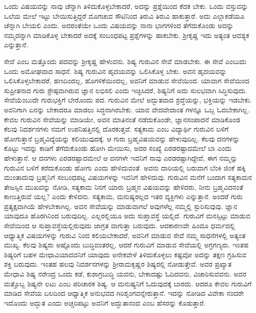 ಒಂದು ವಿಷಯವನ್ನು ನಾವು ಚೆನ್ನಾಗಿ ತಿಳಿದುಕೊಳ್ಳಬೇಕಾದರೆ, ಅದನ್ನು ಪ್ರಶ್ನೆಯಿಂದ ಕೆದಕ ಬೇಕು. ಒಂದು ವಸ್ತುವನ್ನು ಒಲೆಯ ಮೇಲೆ ಇಟ್ಟು ಬೇಯಿಸುತ್ತಿದ್ದರೆ ಮೊಗಚುವ ಸೌಟಿನಿಂದ ತಿರುವಿ ತಿರುವಿ ಹಾಕುತ್ತಾರೆ. ಅದು ಎಲ್ಲಾಕಡೆಯೂ ಚೆನ್ನಾಗಿ ಬೇಯಲಿ ಎಂದು. ಅದರಂತೆಯೇ ಒಂದು ವಿಷಯವನ್ನು ನಾನಾ ಭಾಗಗಳಿಂದ ತೆಗೆದುಕೊಂಡು ಅದನ್ನು ನಮ್ಮದನ್ನಾಗಿ ಮಾಡಿಕೊಳ್ಳ ಬೇಕಾದರೆ ಅದಕ್ಕೆ ಸಂಬಂಧಪಟ್ಟ ಪ್ರಶ್ನೆಗಳನ್ನು ಹಾಕಬೇಕು. ಶ‍್ರೀಕೃಷ್ಣ ಇದು ಅತ್ಯಂತ ಆವಶ್ಯಕ ಎನ್ನುತ್ತಾನೆ.

ಸೇವೆ ಎಂಬ ಮತ್ತೊಂದು ಪದವನ್ನು ಶ‍್ರೀಕೃಷ್ಣ ಹೇಳುವನು. ಶಿಷ್ಯ ಗುರುವಿನ ಸೇವೆ ಮಾಡಬೇಕು. ಈ ಸೇವೆ ಎಂಬುದು ಒಂದು ಅಮೋಘವಾದ ಸಾಧನೆ. ಶಿಷ್ಯ ಗುರುವಿನ ಹೃದಯವನ್ನು ಒಲಿಸಿಕೊಳ್ಳ ಬೇಕು. ಅವನ ಹೃದಯವನ್ನು ಒಲಿಸಿಕೊಳ್ಳಬೇಕಾದರೆ, ಹಣದಿಂದಲ್ಲ, ಹೊಗಳಿಕೆಯಿಂದಲ್ಲ, ಅವನಿಗೆ ಮಾಡುವ ಸೇವೆಯಿಂದ. ಯಾವಾಗ ಸೇವೆಯಿಂದ ಸುಪ್ರೀತನಾದ ಗುರು ಶ್ರೇಷ್ಠವಾಗಿರುವ ಜ್ಞಾನ ಲಭಿಸಲಿ ಎಂದು ಇಚ್ಛಿಸಿದರೆ, ಶಿಷ್ಯನಿಗೆ ಅದು ಸುಲಭವಾಗಿ ಸಿದ್ಧಿಸುವುದು. ಸೇವೆಯೆಂಬುದೇ ಗುರುಭಕ್ತಿಗೆ ಬೇರೊಂದು ಪದ. ಗುರುವಿನ ಮೇಲೆ ಅದ್ಭುತವಾದ ಶ್ರದ್ಧೆಯನ್ನು, ಭಕ್ತಿಯನ್ನು ಇಡಬೇಕು. ಅವನಿಗಾಗಿ ಏನನ್ನು ಬೇಕಾದರೂ ಮಾಡಲು ಸಿದ್ಧನಾಗಿರಬೇಕು. ಯಾವ ವೇದವೇದಾಂತ ಗಳನ್ನೂ ಒಬ್ಬ ಓದಬೇಕಾಗಿಲ್ಲ. ಕೇವಲ ಗುರುವಿನ ಸೇವೆಯನ್ನು ಮಾಡಿಯೇ, ಅವನ ಮಾತಿನಂತೆ ನಡೆದುಕೊಂಡೇ, ಜ್ಞಾನಸಂಪಾದನೆ ಮಾಡಿಕೊಂಡ ಕೆಲವು ನಿದರ್ಶನಗಳು ನಮಗೆ ಉಪನಿಷತ್ತಿನಲ್ಲಿ ದೊರಕುತ್ತವೆ. ಸತ್ಯಕಾಮ ಎಂಬ ವಿದ್ಯಾರ್ಥಿ ಗುರುವಿನ ಬಳಿಗೆ ಹೋಗುತ್ತಾನೆ ಬ್ರಹ್ಮವಿದ್ಯೆಯನ್ನು ಕಲಿಯುವುದಕ್ಕೆ. ಆ ಗುರು ಬ್ರಹ್ಮವಿಷಯವನ್ನು ಹೇಳುವುದಿಲ್ಲ. ಕೆಲವು ದನಗಳನ್ನು ಕೊಟ್ಟು ಇದನ್ನು ಕಾಡಿಗೆ ತೆಗೆದುಕೊಂಡು ಹೋಗಿ ಮೇಯಿಸು, ಅದರ ಸಂಖ್ಯೆ ಎರಡರಷ್ಟಾದಮೇಲೆ ಬಾ ಎಂದು ಹೇಳುತ್ತಾನೆ. ಆ ದನಗಳು ಎರಡರಷ್ಟಾದಮೇಲೆ ಆ ದನಗಳೇ ಇವನಿಗೆ ನಾವು ಎರಡರಷ್ಟಾಗಿದ್ದೇವೆ, ಈಗ ನಮ್ಮನ್ನು ಗುರುವಿನ ಬಳಿಗೆ ಕರೆದುಕೊಂಡು ಹೋಗು ಎಂದು ಹೇಳಿದುವಂತೆ. ಅವನು ದಾರಿಯಲ್ಲಿ ಬರುವಾಗ ಬೆಂಕಿ ಜಿಂಕೆ ಹಕ್ಕಿ ಮುಂತಾದುವು ಬ್ರಹ್ಮನಿಗೆ ಸಂಬಂಧಪಟ್ಟ ವಿಷಯಗಳನ್ನು ಇವನಿಗೆ ಹೇಳಿದುವು. ಗುರುವಿನ ಮನೆಗೆ ಬಂದಾಗ ಸತ್ಯಕಾಮನ ತೇಜಸ್ಸಿನ ಮುಖವನ್ನು ನೋಡಿ, ಸತ್ಯಕಾಮ ನಿನಗೆ ಯಾರು ಬ್ರಹ್ಮನ ವಿಷಯವನ್ನು ಹೇಳಿದರು, ನೀನು ಬ್ರಹ್ಮವಿದನಂತೆ ಕಾಣುತ್ತಿರುವೆ ಯಲ್ಲ? ಎಂದು ಕೇಳಿದನು. ಸತ್ಯಕಾಮ, ಮನುಷ್ಯರಲ್ಲದ ಇತರ ವ್ಯಕ್ತಿಗಳು ಎನ್ನುತ್ತಾನೆ. ಅಂದರೆ ಗುರು ಪ್ರತ್ಯಕ್ಷವಾಗಿಯೆ ಹೇಳಬೇಕಾಗಿಲ್ಲ. ಅವನ ಸೇವೆಯನ್ನು ಮಾಡುವಾಗಲೆ ಅವುಗಳೆಲ್ಲ ನಮ್ಮಲ್ಲಿ ಸ್ಫುರಿಸುವುವು. ಜ್ಞಾನ ಯಾವುದೂ ಹೊರಗಿನಿಂದ ಬರುವುದಿಲ್ಲ. ಎಲ್ಲರಲ್ಲಿಯೂ ಅದು ಸುಪ್ತಾವಸ್ಥೆ ಯಲ್ಲಿದೆ. ಗುರುವಿಗೆ ಮನಸ್ಸಿಟ್ಟು ಮಾಡುವ ಸೇವೆಯಿಂದ ಆ ಸುಪ್ತಾವಸ್ಥೆಯಲ್ಲಿರುವುದು ಜಾಗ್ರತ ವಾಗುತ್ತಾ ಬರುವುದು. ಆದಕಾರಣವೇ ಹಿಂದೂ ಧರ್ಮದಲ್ಲಿ ಆಧ್ಯಾತ್ಮಿಕ ವಿಷಯಗಳನ್ನು ಗುರುವಿ ನಿಂದ ಕಲಿಯಬೇಕಾದರೆ, ಅವನಿಗೆ ಮಾಡುವ ಸೇವೆ ನಮ್ಮ ಸಾಧನೆಗಳಲ್ಲಿ ಅತ್ಯಂತ ಮುಖ್ಯ. ಕೆಲವು ಶಿಷ್ಯರು ಅಷ್ಟೊಂದು ಬುದ್ಧಿವಂತರಲ್ಲ, ಆದರೆ ಗುರುವಿಗೆ ಮಾಡುವ ಸೇವೆಯಲ್ಲಿ ಅಗ್ರಗಣ್ಯರು. ಇಂತಹ ಶಿಷ್ಯರಿಗೆ ಬಹಳ ಮೇಧಾವಿಯಾದವನಿಗೆ ಯಾವುದು ಅನೇಕವೇಳೆ ತಿಳಿದುಕೊಳ್ಳಲು ಕಷ್ಟವೋ ಅದನ್ನು ತಕ್ಷಣ ಗ್ರಹಿಸುವ ಶಕ್ತಿ ಬರುವುದು. ಇಂತಹ ಹಲವು ನಿದರ್ಶನಗಳನ್ನು ಶ‍್ರೀರಾಮಕೃಷ್ಣರ ಶಿಷ್ಯರಲ್ಲಿ ನೋಡುತ್ತೇವೆ. ಅವರ ಪ್ರಖ್ಯಾತ ಮೇಧಾವಿ ಶಿಷ್ಯ ನರೇಂದ್ರ ಒಂದು ಕಡೆ, ಕುಶಾಗ್ರಬುದ್ಧಿ ಯವನು, ಬೇಕಾದಷ್ಟು ಓದಿದವನು, ವಿಚಾರಿಸುವವನು. ಅವರ ಮತ್ತೊಬ್ಬ ಶಿಷ್ಯನೇ ಲಟು ಎಂಬ ಪರಿಚಾರಕ ಶಿಷ್ಯ. ಆ ಮನುಷ್ಯನಿಗೆ ಓದುವುದಕ್ಕೆ ಬಾರದು. ಆದರೂ ಕೇವಲ ಗುರುವಿಗೆ ಮಾಡಿದ ಸೇವೆಯ ಬಲದಿಂದ ಆಧ್ಯಾತ್ಮಿಕ ಅನುಭವದ ಗಿರಿಶೃಂಗವನ್ನೇರುತ್ತಾನೆ. ಇದನ್ನು ನೋಡಿದ ವಿವೇಕಾ ನಂದರೇ ಇದೊಂದು ಅದ್ಭುತ ಎಂದು ಅಚ್ಚರಿಪಟ್ಟು ಅವನಿಗೆ ಅದ್ಭುತಾನಂದ ಎಂಬ ಹೆಸರನ್ನು ಕೊಡುತ್ತಾರೆ.

